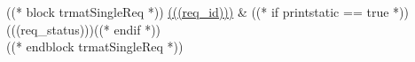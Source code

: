 ((* block trmatSingleReq *))
\hyperref[(((req_id)))]{(((req_id)))} \label{trmat:(((req_id)))} & %
((* if printstatic == true *))(((req_status)))((* endif *)) %
 \\
((* endblock trmatSingleReq *))
